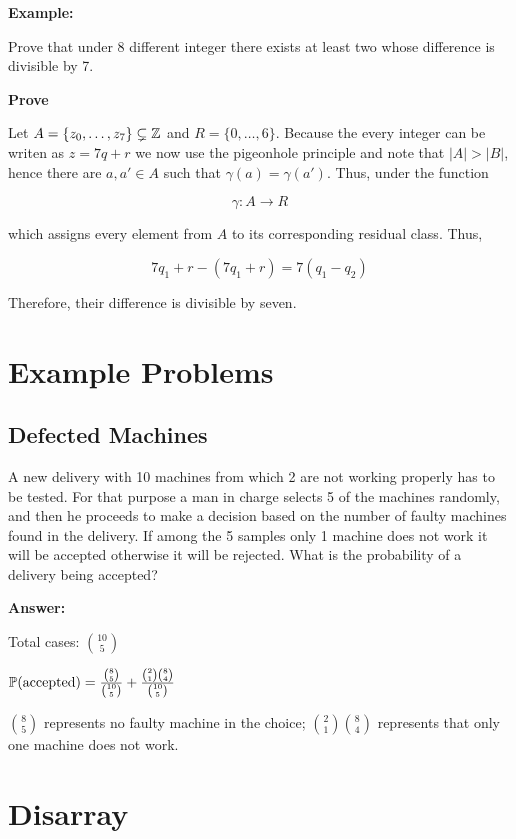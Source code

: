 \textbf{Example:}

Prove that under 8 different integer there exists at least two whose difference is divisible by 7.

\textbf{Prove}

Let \(A = \{z_0, \dots, z_7\} \subsetneq \mathbb{Z}\) and \(R = \{0, \dots, 6\}\). Because the every integer can be writen as
\(z = 7q + r\) we now use the pigeonhole principle and note that \(|A| > |B|\), hence there are \(a, a' \in A\) such that \(\gamma(a) = \gamma(a')\). Thus,
under the function

\[
	\gamma: A \to R
\]

which assigns every element from \(A\) to its corresponding residual class. Thus,

\[
	7q_1 + r - (7q_1 + r) = 7(q_1 - q_2)
\]

Therefore, their difference is divisible by seven.

\QED

\section{Example Problems}

\subsection*{Defected Machines}

A new delivery with 10 machines from which 2 are not working properly has to be tested. For that purpose a
man in charge selects 5 of the machines randomly, and then he proceeds to make a decision based on the number of faulty machines found
in the delivery. If among the 5 samples only 1 machine does not work it will be accepted otherwise it will be rejected. What is the
probability of a delivery being accepted?

\textbf{Answer:}

Total cases: \(\binom{10}{5}\)

\(\mathbb{P}(\text{accepted}) = \frac{\binom{8}{5}}{\binom{10}{5}} + \frac{\binom{2}{1}\binom{8}{4}}{\binom{10}{5}}\)

\(\binom{8}{5}\) represents no faulty machine in the choice; \(\binom{2}{1}\binom{8}{4}\) represents that only one machine does not work.

\section{Disarray}

